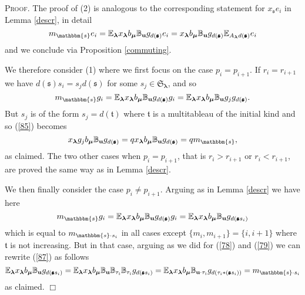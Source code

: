 \documentclass[10pt,a4,twoside,hidelinks,rm]{article}
\newcommand{\BB}{\mathbb{B}}
\newcommand\es{\mathbbm{s}}
\newcommand\bu{\mathbf{u}}
\newcommand{\bT}{\pmb{\mathfrak{t}}}
\newcommand{\Bs}{\pmb{\mathfrak{s}}}
\newcommand{\Si}{\mathfrak{S}}
\newcommand\blambda{{\boldsymbol\lambda}}
\newcommand\be{\mathbb{E}}
\newcommand\bmu{{\boldsymbol\mu}}
\theoremstyle{plain}
\newenvironment{demo}
{\textsc{Proof.}} {\quad \hfill $\Box$}
\begin{document}
\begin{demo}
  The proof of (2) is analogous to the corresponding statement for
  $ x_{\Bs } e_i $ in Lemma \ref{descr}, in detail 
\begin{equation}  
  m_{\es} e_i = \be_{\blambda} x_{\blambda} b_{\bmu} \BB_{\bu} g_{d(\Bs)}  e_i = 
 x_{\blambda} b_{\bmu} \BB_{\bu} g_{   d(\Bs) }
\be_{A_{\blambda} d(\Bs)} e_i 
\end{equation}
and we conclude via Proposition \ref{commuting}.

We therefore consider (1) where we first focus on the case $ p_i = p_{i+1}$. 
If $ r_i = r_{i+1} $ we have $ d(\Bs) s_i = s_j d(\Bs) $
for some $ s_j \in \Si_{\blambda} $, and so 
\begin{equation}\label{85}  
  m_{\es} g_i = \be_{\blambda} x_{\blambda} b_{\bmu} \BB_{\bu} g_{d(\Bs)}  g_i =  \be_{\blambda}
 x_{\blambda} b_{\bmu} \BB_{\bu} g_j g_{   d(\Bs) }.
\end{equation}
But $ s_j $ is of the form $s_j = d(\bT) $ where  $\bT $ is a multitableau of the initial kind and so (\ref{85})
becomes
\begin{equation}\label{86}  
  x_{\blambda} g_j  b_{\bmu} \BB_{\bu} g_{   d(\Bs) } = q  x_{\blambda}   b_{\bmu} \BB_{\bu} g_{   d(\Bs) } = 
  q m_{ \es},  
\end{equation}
as claimed. The two other cases when $ p_i = p_{i+1} $, that is $ r_i > r_{i+1} $ or $ r_i < r_{i+1} $, are
proved the same way as in Lemma \ref{descr}. 

We then finally consider the case $ p_i \neq p_{i+1}$. Arguing as in Lemma \ref{descr} we have
here 
\begin{equation}\label{87}  
  m_{\es} g_i = \be_{\blambda} x_{\blambda} b_{\bmu} \BB_{\bu} g_{d(\Bs)}  g_i =
\be_{\blambda} x_{\blambda} b_{\bmu} \BB_{\bu} g_{d(\Bs  s_i)}   
  \end{equation}
which is equal to $ m_{\es \cdot s_i } $ in all cases except $ \{ m_i, m_{i+1} \} = \{ i, i+1\} $
where $ \bT $ is not increasing. But in that case, arguing as we did 
for (\ref{78}) and (\ref{79})
we can rewrite (\ref{87})
as follows
\begin{equation}
  \be_{\blambda} x_{\blambda} b_{\bmu} \BB_{\bu} g_{d(\Bs  s_i)} =
  \be_{\blambda} x_{\blambda} b_{\bmu} \BB_{\bu} \BB_{\tau_i} \BB_{\tau_i} g_{d(\Bs  s_i)} = 
  \be_{\blambda} x_{\blambda} b_{\bmu} \BB_{\bu  \cdot \tau_i }   g_{d( \tau_i \ast (\Bs  s_i))} = 
m_{\es \cdot s_i }
\end{equation}
as claimed.
\end{demo}  
\end{document}
